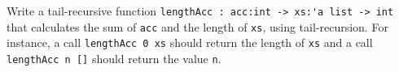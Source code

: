 Write a tail-recursive function %
\lstinline{lengthAcc : acc:int -> xs:'a list -> int} %
that calculates the sum of \lstinline{acc} and the length
of \lstinline{xs}, using tail-recursion. For instance, a
call \lstinline{lengthAcc 0 xs} should return the length
of \lstinline{xs} and a call %
\lstinline{lengthAcc n []} %
should return the value \lstinline{n}.
